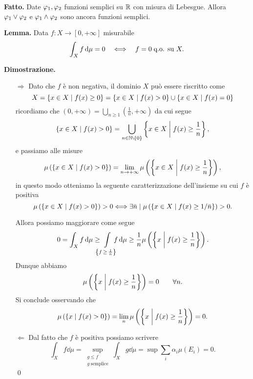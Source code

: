 \documentclass[a4paper, 12pt]{report}
\begin{document}
\textbf{Fatto.}
Date $\varphi_1, \varphi_2$ funzioni semplici su $\mathbb R$ con misura di Lebesgue.
Allora $\varphi_1 \vee \varphi_2$ e $\varphi_1 \wedge \varphi_2$ sono ancora funzioni semplici.

\textbf{Lemma.}
Data $f \colon X \to [0, +\infty]$ misurabile
$$
\int_X f \,\mathrm{d} \mu = 0 \quad \Longleftrightarrow \quad f = 0 \; \text{q.o. su } X.
$$

\textbf{Dimostrazione.}
\begin{itemize}

\item[$\boxed{\Rightarrow}$] Dato che $f$ è non negativa, il dominio $X$ può essere riscritto come
$$
	X = \left\{ x \in X \;\middle|\; f(x) \geq 0 \right\} = \left\{ x \in X \;\middle|\; f(x) > 0 \right\} \cup \left\{ x \in X \;\middle|\; f(x) = 0 \right\}
$$
ricordiamo che $(0, +\infty) = \bigcup_{n \geq 1} (\frac{1}{n}, +\infty)$ da cui segue
$$
	\left\{ x \in X \mymid f(x) > 0 \right\} =  \bigcup_{n \in \N \setminus \left\{ 0 \right\}} \left\{ x \in X \mymid f(x) \geq \frac{1}{n} \right\},
$$
e passiamo alle misure
$$
	\mu \left( \left\{ x \in X \;\middle|\; f(x) > 0 \right\} \right) 
	= \lim_{n \to +\infty} \mu\left(\left\{ x \in X \;\middle|\; f(x) \geq \frac{1}{n} \right\}\right),
$$
in questo modo otteniamo la seguente caratterizzazione dell'insieme su cui $f$ è positiva
$$
	\mu \left( \left\{ x \in X \;\middle|\; f(x) > 0 \right\} \right) >0 
	\Longleftrightarrow
	\exists \bar{n} \mid \mu \left( \left\{ x \in X \;\middle|\; f(x) \geq 1 / \bar{n} \right\} \right) > 0.
$$

Allora possiamo maggiorare come segue
$$
	0 = \int_X f \dd \mu 
	\geq \;\int\limits_{\mathclap{\left\{ f \,\geq\, \frac{1}{n} \right\}}} \; f \dd \mu \geq	\frac{1}{n} \mu \left(  \left\{ x \mymid f(x) \geq \frac{1}{n} \right\} \right). 
$$
Dunque abbiamo
$$
	\mu \left(  \left\{ x \;\middle|\; f(x) \geq \frac{1}{n} \right\} \right) = 0 \qquad \forall n.
$$
Si conclude osservando che
$$
	\mu \left(  \left\{ x \;\middle|\; f(x) > 0 \right\} \right) = \lim_n \mu \left( \left\{ x \;\middle|\; f(x) \geq \frac{1}{n} \right\} \right) = 0.
$$

\item[$\boxed{\Leftarrow}$]
Dal fatto che $f$ è positiva possiamo scrivere
$$
	\int_X f \dd \mu = \sup_{\substack{g \leq f \\ g \; \text{semplice}}} \int_X g \dd \mu = \sup \sum_{i}^{} \alpha_i \mu(E_i) = 0. 
$$
\qed

\end{itemize}
\end{document}
